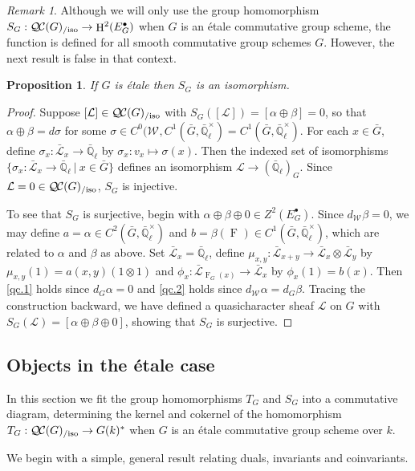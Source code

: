 \documentclass[10pt]{amsart}
\theoremstyle{plain}
\newtheorem{proposition}[theorem]{Proposition}
\theoremstyle{definition}
\theoremstyle{remark}
\newtheorem{remark}[theorem]{Remark}
\newcommand{\EE}{\mathbb{\bar Q}_\ell}
\newcommand{\Fq}{k}
\newcommand{\EEx}{\EE^\times}
\newcommand{\Weil}[1]{\mathcal{W}_{#1}}
\newcommand{\Frob}[1]{\operatorname{F}_{#1}}
\DeclareMathOperator{\Hh}{H}
\newcommand{\tq}{{\ \vert\ }}
\newcommand{\TrFrob}[1]{T_{#1}}
\newcommand{\qcs}[1]{{\mathcal{#1}}}
\newcommand{\gqcs}[1]{{\mathcal{\bar #1}}}
\newcommand{\QC}{{\mathcal{Q\hskip-0.8pt C}}}
\newcommand{\QCiso}[1]{\QC(#1)_{/\text{iso}}}
\begin{document}
\begin{remark}
Although we will only use the group homomorphism $S_G : \QCiso{G}\to \Hh^2(E^\bullet_G)$ when $G$ is an \'etale commutative group scheme, the function is defined for all smooth commutative group schemes $G$.
However, the next result is false in that context.
\end{remark}

\begin{proposition}\label{prop:SGiso}
If $G$ is \'etale then $S_G$ is an isomorphism.
\end{proposition}
\begin{proof}
Suppose $[\qcs{L}] \in \QCiso{G}$ with $S_G([\qcs{L}]) = [\alpha \oplus \beta] = 0$,
so that $\alpha \oplus \beta = d\sigma$ for some $\sigma \in C^0(\Weil{},C^1({\bar G},\EEx) = C^1({\bar G},\EEx)$.
For each $x\in {\bar G}$, define $\sigma_x : \gqcs{L}_x \to \EE$ by $\sigma_x : v_x \mapsto \sigma(x)$.
Then the indexed set of isomorphisms $\{ \sigma_x : \gqcs{L}_x \to \EE \tq x\in {\bar G}\}$
defines an isomorphism $\qcs{L} \to (\EE)_G$.
Since $\qcs{L} = 0 \in \QCiso{G}$, $S_G$ is injective.

To see that $S_G$ is surjective, begin with $\alpha\oplus\beta\oplus 0 \in Z^2(E^\bullet_G)$.
Since $d_{\Weil{}} \beta = 0$, we may define $a = \alpha \in C^2({\bar G},\EEx)$ and
$b = \beta(\Frob{}) \in C^1({\bar G},\EEx)$, which are related to $\alpha$ and $\beta$ as above.
Set $\gqcs{L}_x = \EE$, define $\mu_{x,y} : \gqcs{L}_{x+y} \to \gqcs{L}_x\otimes\gqcs{L}_y$
by $\mu_{x,y}(1) = a(x,y) (1\otimes 1)$ and $\phi_x : \gqcs{L}_{\Frob{G}(x)} \to \gqcs{L}_x$ by $\phi_x(1)= b(x)$.
Then \ref{qc.1} holds since $d_G \alpha =0$ and \ref{qc.2} holds since $d_{\Weil{}}\alpha =d_G \beta$.
Tracing the construction backward, we have defined a quasicharacter sheaf $\qcs{L}$ on $G$ with
$S_G(\qcs{L}) = [\alpha\oplus\beta\oplus 0]$, showing that $S_G$ is surjective.
\end{proof}

\subsection{Objects in the \'etale case}\label{ssec:SandT}

In this section we fit the group homomorphisms $\TrFrob{G}$ and $S_G$ into a commutative diagram, determining the kernel and cokernel of the homomorphism $\TrFrob{G} : \QCiso{G} \to G(k)^*$ when $G$ is an \'etale commutative group scheme over $\Fq$.

%
We begin with a simple, general result relating duals, invariants and coinvariants.
\end{document}
